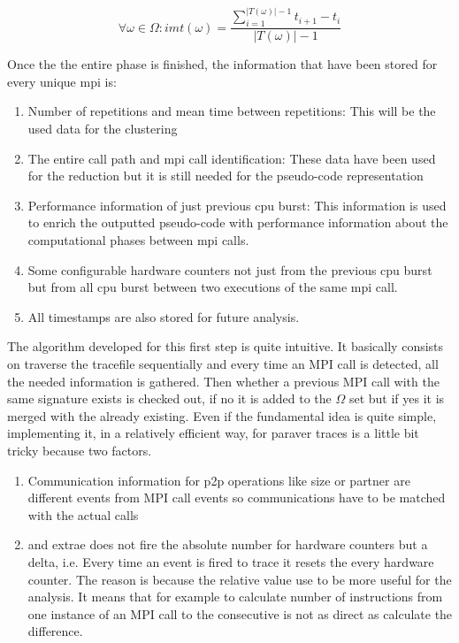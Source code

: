 \begin{equation}
\forall \omega \in \Omega : imt(\omega)=\frac{\sum\limits_{i=1}^{|T(\omega)|-1} t_{i+1}-t_{i}}{|T(\omega)|-1}
\label{eq:imt_formila}
\end{equation}

Once the the entire phase is finished, the information that have been 
stored for every unique mpi is:
\begin{enumerate}[label=\roman*)]
  \item Number of repetitions and mean time between repetitions: This will be
    the used data for the clustering
  \item The entire call path and mpi call identification: These data have been
    used for the reduction but it is still needed for the pseudo-code
    representation
  \item Performance information of just previous cpu burst: This information is
    used to enrich the outputted pseudo-code with performance information
    about the computational phases between mpi calls.
  \item Some configurable hardware counters not just from the previous cpu burst
    but from all cpu burst between two executions of the same mpi call.
  \item All timestamps are also stored for future analysis.
\end{enumerate}

The algorithm developed for this first step is quite intuitive. It basically
consists on traverse the tracefile sequentially and every time an MPI call is
detected, all the needed information is gathered. Then whether a previous MPI call
with the same signature exists is checked out, if no it is added to the
$\Omega$ set but if yes it is merged with the already existing. Even if the
fundamental idea is quite simple, implementing it, in a relatively efficient
way, for paraver traces is a little bit tricky because two factors.
\begin{enumerate}[label=\roman*)]
  \item Communication information for p2p operations like size or partner are different events from
    MPI call events so communications have to be matched with the actual calls
  \item and extrae does not fire the absolute number for hardware counters but a
    delta, i.e. Every time an event is fired to trace it resets the every
    hardware counter. The reason is because the relative value use to be more
    useful for the analysis. It means that for example to
    calculate number of instructions from one instance of an MPI call to the
    consecutive is not as direct as calculate the difference.
\end{enumerate}


